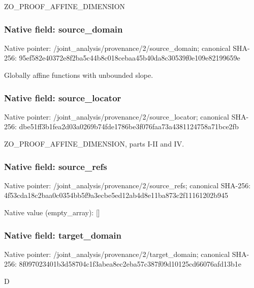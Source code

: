 \documentclass[10pt,a4paper]{article}
\begin{document}
\begingroup\raggedright\sloppy ZO\_\allowbreak{}PROOF\_\allowbreak{}AFFINE\_\allowbreak{}DIMENSION\par\endgroup

\subsubsection{Native field: source\_\allowbreak{}domain}
Native pointer: /joint\_\allowbreak{}analysis/provenance/2/source\_\allowbreak{}domain; canonical SHA-256: 95ef582e40372e8f2ba5c44b8c018cebaa45b40da8c30539f0e109e82199659e

\begingroup\raggedright\sloppy Globally affine functions with unbounded slope.\par\endgroup

\subsubsection{Native field: source\_\allowbreak{}locator}
Native pointer: /joint\_\allowbreak{}analysis/provenance/2/source\_\allowbreak{}locator; canonical SHA-256: dbe51ff3b1fea2d03a0269b74fde1786be3f076faa73a4381124758a71bce2fb

\begingroup\raggedright\sloppy ZO\_\allowbreak{}PROOF\_\allowbreak{}AFFINE\_\allowbreak{}DIMENSION,\allowbreak{} parts I-II and IV.\par\endgroup

\subsubsection{Native field: source\_\allowbreak{}refs}
Native pointer: /joint\_\allowbreak{}analysis/provenance/2/source\_\allowbreak{}refs; canonical SHA-256: 4f53cda18c2baa0c0354bb5f9a3ecbe5ed12ab4d8e11ba873c2f11161202b945

Native value (empty\_\allowbreak{}array): []

\subsubsection{Native field: target\_\allowbreak{}domain}
Native pointer: /joint\_\allowbreak{}analysis/provenance/2/target\_\allowbreak{}domain; canonical SHA-256: 8f097023401b3d58704c1f3abea8ec2eba57c387f09d10125cd66076afd13b1e

\begingroup\raggedright\sloppy D\par\endgroup
\end{document}
